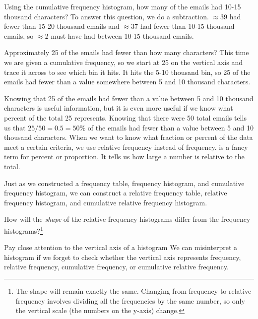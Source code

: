 \begin{example}{Using the cumulative frequency histogram, how many of the emails had 10-15 thousand characters?}
To answer this question, we do a subtraction. $\approx$39 had fewer than 15-20 thousand emails and $\approx$37 had fewer than 10-15 thousand emails, so $\approx$2 must have had between 10-15 thousand emails.
\end{example}

\begin{example}{Approximately 25 of the emails had fewer than how many characters?}
This time we are given a cumulative frequency, so we start at 25 on the vertical axis and trace it across to see which bin it hits. It hits the 5-10 thousand bin, so 25 of the emails had fewer than a value somewhere between 5 and 10 thousand characters.
\end{example}

Knowing that 25 of the emails had fewer than a value between 5 and 10 thousand characters is useful information, but it is even more useful if we know what percent of the total 25 represents. Knowing that there were 50 total emails tells us that $25 / 50 = 0.5 = 50\%$ of the emails had fewer than a value between 5 and 10 thousand characters. When we want to know what fraction or percent of the data meet a certain criteria, we use relative frequency instead of frequency.  is a fancy term for percent or proportion. It tells us how large a number is relative to the total.

Just as we constructed a frequency table, frequency histogram, and cumulative frequency histogram, we can construct a relative frequency table, relative frequency histogram, and cumulative relative frequency histogram.

\begin{exercise}
How will the \emph{shape} of the relative frequency histograms differ from the frequency histograms?\footnote{The shape will remain exactly the same. Changing from frequency to relative frequency involves dividing all the frequencies by the same number, so only the vertical scale (the numbers on the y-axis) change.}
\end{exercise}

\begin{caution}{Pay close attention to the vertical axis of a histogram}
{We can misinterpret a histogram if we forget to check whether the vertical axis represents frequency, relative frequency, cumulative frequency, or cumulative relative frequency.}
\end{caution}


